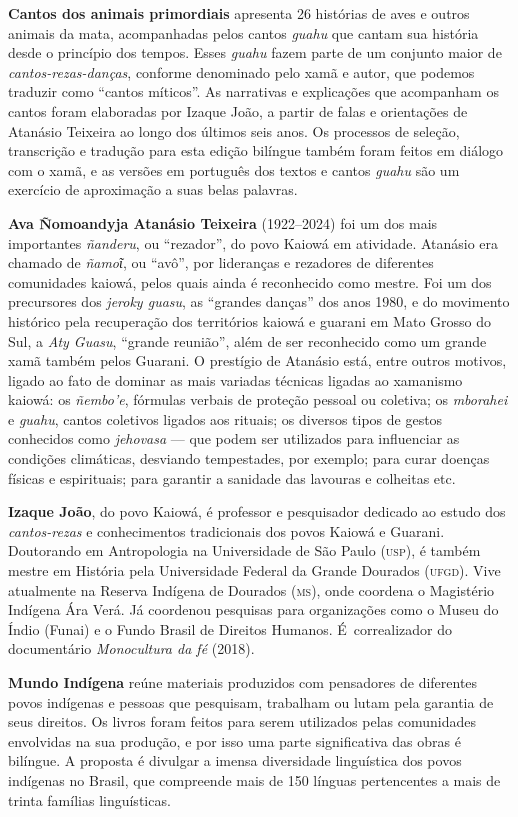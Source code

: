 \textbf{Cantos dos animais primordiais} apresenta 26 histórias de aves e outros animais da mata, acompanhadas pelos cantos \textit{guahu} que cantam sua história desde o princípio dos tempos. Esses \textit{guahu} fazem parte de um conjunto maior de \textit{cantos-rezas-danças}, conforme denominado pelo xamã e autor, que podemos traduzir como ``cantos míticos''. As narrativas e explicações que acompanham os cantos foram elaboradas por Izaque João, a partir de falas e orientações de Atanásio Teixeira ao longo dos últimos seis anos. Os processos de seleção, transcrição e tradução para esta edição bilíngue também foram feitos em diálogo com o xamã, e as versões em português dos textos e cantos \textit{guahu} são um exercício de aproximação a suas belas palavras.

\textbf{Ava Ñomoandyja Atanásio Teixeira} {(1922--2024) foi um dos mais importantes \textit{ñanderu}, ou ``rezador'', do povo Kaiowá em atividade. Atanásio era chamado de \textit{ñamoῖ}, ou ``avô'', por lideranças e rezadores de diferentes comunidades kaiowá, pelos quais ainda é reconhecido como mestre. Foi um dos precursores dos \textit{jeroky guasu}, as ``grandes danças'' dos anos 1980, e do movimento histórico pela recuperação dos territórios kaiowá e guarani em Mato Grosso do Sul, a \textit{Aty Guasu}, ``grande reunião'', além de ser reconhecido como um grande xamã também pelos Guarani. O prestígio de Atanásio está, entre outros motivos, ligado ao fato de dominar as mais variadas técnicas ligadas ao xamanismo kaiowá: os \textit{ñembo'e}, fórmulas verbais de proteção pessoal ou coletiva; os \textit{mborahei} e \textit{guahu}, cantos coletivos ligados aos rituais; os diversos tipos de gestos conhecidos como \textit{jehovasa} --- que podem ser utilizados para influenciar as condições climáticas, desviando tempestades, por exemplo; para curar doenças físicas e espirituais; para garantir a sanidade das lavouras e colheitas etc.}

\textbf{Izaque João}, do povo Kaiowá, é professor e pesquisador dedicado ao estudo dos \textit{cantos-rezas} e conhecimentos tradicionais dos povos Kaiowá e Guarani. Doutorando em
Antropologia na Universidade de São Paulo (\textsc{usp}), é também mestre em História pela
Universidade Federal da Grande Dourados (\textsc{ufgd}). Vive atualmente na Reserva
Indígena de Dourados (\textsc{ms}), onde coordena o Magistério Indígena Ára Verá. Já
coordenou pesquisas para organizações como o Museu do Índio (Funai) e o Fundo
Brasil de Direitos Humanos. É~correalizador do documentário \textit{Monocultura da fé} (2018).

\textbf{Mundo Indígena} reúne materiais produzidos com pensadores de diferentes povos indígenas e pessoas que pesquisam, trabalham ou lutam pela garantia de seus direitos. Os livros foram feitos para serem utilizados pelas comunidades envolvidas na sua produção, e por isso uma parte significativa das obras é bilíngue. A proposta é divulgar a imensa diversidade linguística dos povos indígenas no Brasil, que compreende mais de 150 línguas pertencentes a mais de trinta famílias linguísticas.\par



